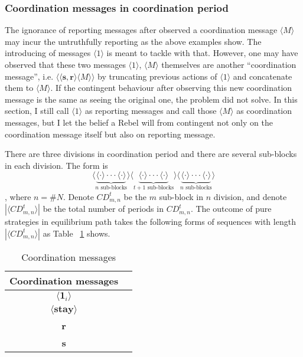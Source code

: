 \documentclass[12pt,letter]{article}
\theoremstyle{definition}
\theoremstyle{remark}
\theoremstyle{claim}
\begin{document}
\subsubsection*{Coordination messages in coordination period}

The ignorance of reporting messages after observed a coordination message $\langle M \rangle$ may incur the untruthfully reporting as the above examples show. The introducing of messages $\langle 1 \rangle$ is meant to tackle with that. However, one may have observed that these two messages $\langle 1 \rangle$, $\langle M \rangle$ themselves are another ``coordination message'', i.e. $\langle\langle \textbf{s}, \textbf{r} \rangle\langle M \rangle\rangle$ by truncating previous actions of $\langle 1 \rangle$ and concatenate them to $\langle M \rangle$. If the contingent behaviour after observing this new coordination message is the same as seeing the original one, the problem did not solve. In this section, I still call $\langle 1 \rangle$ as reporting messages and call those $\langle M \rangle$ as coordination messages, but I let the belief a Rebel will from contingent not only on the coordination message itself but also on reporting message.


There are three divisions in coordination period and there are several sub-blocks in each division. The form is
\[\langle\underbrace{\langle \cdot \rangle \cdot \cdot \cdot \langle \cdot \rangle}_{\text{$n$ sub-blocks}}\rangle \langle\underbrace{\langle \cdot \rangle \cdot \cdot \cdot \langle \cdot \rangle}_{\text{$t+1$ sub-blocks}} \rangle \langle\underbrace{\langle \cdot \rangle \cdot \cdot \cdot \langle \cdot \rangle}_{\text{$n$ sub-blocks}}\rangle\] 
, where $n=\# N$. Denote $CD^t_{m,n}$ be the $m$ sub-block in $n$ division, and denote $|\langle CD^t_{m,n} \rangle|$ be the total number of periods in $CD^t_{m,n}$.  The outcome of pure strategies in equilibrium path takes the following forms of sequences with length $|\langle CD^t_{m,n} \rangle|$ as Table ~\ref{Table_msg_coordination} shows.
\begin{table}[t]
\caption{Coordination messages}
\label{Table_msg_coordination}
\begin{center}

\begin{tabular}{cc }
Coordination messages		&   \\
\hline
$\langle \mathbf{1}_i \rangle$ 	& 	 \\
$\langle \textbf{stay} \rangle$	&   \\
\textbf{r}									& 	\\
\textbf{s}									& 	\\
\end{tabular}
\end{center}
\end{table}
\end{document}
